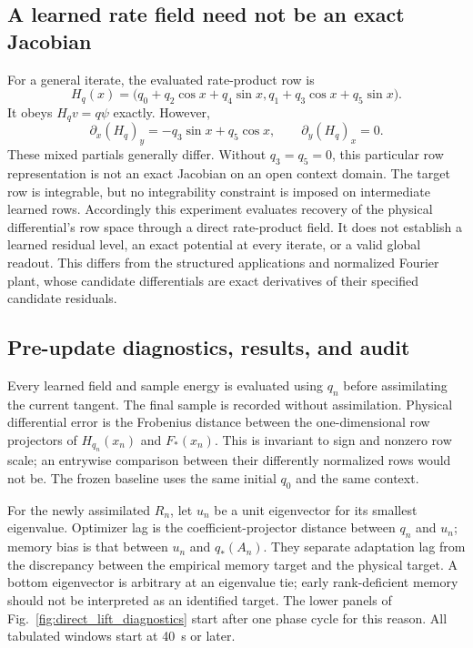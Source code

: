\documentclass[journal]{IEEEtran}
\begin{document}
\subsection{A learned rate field need not be an exact Jacobian}
For a general iterate, the evaluated rate-product row is
\begin{equation}
 H_q(x)=\bigl(q_0+q_2\cos x+q_4\sin x,
                 q_1+q_3\cos x+q_5\sin x\bigr).
\end{equation}
It obeys $H_qv=q\psi$ exactly. However,
\begin{equation}
 \partial_x(H_q)_y=-q_3\sin x+q_5\cos x,
 \qquad \partial_y(H_q)_x=0.
\end{equation}
These mixed partials generally differ. Without $q_3=q_5=0$, this
particular row representation is not an exact Jacobian on an open
context domain. The target row is integrable, but no integrability
constraint is imposed on intermediate learned rows. Accordingly this
experiment evaluates recovery of the physical differential's row space
through a direct rate-product field. It does not establish a learned
residual level, an exact potential at every iterate, or a valid global
readout. This differs from the structured applications and normalized Fourier
plant, whose
candidate differentials are exact derivatives of their specified
candidate residuals.

\subsection{Pre-update diagnostics, results, and audit}
Every learned field and sample energy is evaluated using $q_n$ before
assimilating the current tangent. The final sample is recorded without
assimilation. Physical differential error is the Frobenius distance
between the one-dimensional row projectors of $H_{q_n}(x_n)$ and
$F_*(x_n)$. This is invariant to sign and nonzero row scale; an entrywise
comparison between their differently normalized rows would not be.
The frozen baseline uses the same initial $q_0$ and the same context.

For the newly assimilated $R_n$, let $u_n$ be a unit eigenvector for its
smallest eigenvalue. Optimizer lag is the coefficient-projector distance
between $q_n$ and $u_n$; memory bias is that between $u_n$ and $q_*(A_n)$.
They separate adaptation lag from the discrepancy between the empirical
memory target and the physical target. A bottom eigenvector is arbitrary
at an eigenvalue tie; early rank-deficient memory should not be interpreted
as an identified target. The lower panels of
Fig.~\ref{fig:direct_lift_diagnostics} start after one phase cycle for this
reason. All tabulated windows start at 40~s or later.
\end{document}
